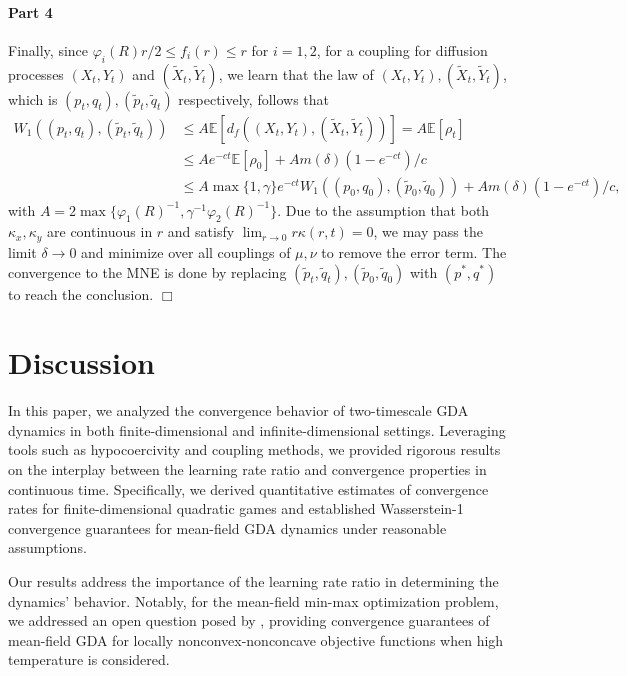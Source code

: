 \documentclass[11pt]{article}
\newcommand{\1}{\mathds{1}}
\newcommand{\E}{\mathbb{E}}
\begin{document}
\paragraph{Part 4} Finally, since $\varphi_i(R)r/2\leq f_i(r)\leq r$ for $i=1,2$, for a coupling for diffusion processes $(X_t, Y_t)$ and $(\tilde{X}_t, \tilde{Y}_t)$, we learn that the law of $(X_t, Y_t), (\tilde{X}_t,\tilde{Y}_t)$, which is $(p_t, q_t), (\tilde{p}_t, \tilde{q}_t)$ respectively, follows that
\begin{equation}
\begin{aligned}
    W_1((p_t, q_t), (\tilde{p}_t, \tilde{q}_t))&\leq A \E[d_f((X_t, Y_t), (\tilde{X}_t, \tilde{Y}_t))] = A\E[\rho_t]\\
    &\leq Ae^{-ct}\E[\rho_0]+Am(\delta)(1-e^{-ct})/c\\
    &\leq A\max\{1,\gamma\}e^{-ct} W_1((p_0, q_0), (\tilde{p}_0, \tilde{q}_0))+Am(\delta)(1-e^{-ct})/c,
    \end{aligned}
\end{equation}
with $A = 2\max\{\varphi_1(R)^{-1}, \gamma^{-1}\varphi_2(R)^{-1}\}$. Due to the assumption that both $\kappa_x, \kappa_y$ are continuous in $r$ and satisfy $\lim_{r\to 0} r \kappa(r,t) = 0$, we may pass the limit $\delta\to 0$ and  minimize over all couplings of $\mu,\nu$ to remove the error term. The convergence to the MNE is done by replacing $(\tilde{p}_t, \tilde{q}_t), (\tilde{p}_0, \tilde{q}_0)$ with $(p^*, q^*)$ to reach the conclusion. $\Box$


\section{Discussion}

In this paper, we analyzed the convergence behavior of two-timescale GDA dynamics in both finite-dimensional and infinite-dimensional settings. Leveraging tools such as hypocoercivity and coupling methods, we provided rigorous results on the interplay between the learning rate ratio and convergence properties in continuous time. Specifically, we derived quantitative estimates of convergence rates for finite-dimensional quadratic games and established Wasserstein-1 convergence guarantees for mean-field GDA dynamics under reasonable assumptions.

Our results address the importance of the learning rate ratio in determining the dynamics' behavior. Notably, for the mean-field min-max optimization problem, we addressed an open question posed by \cite{wang2024open}, providing convergence guarantees of mean-field GDA for locally nonconvex-nonconcave objective functions when high temperature is considered.
\end{document}
